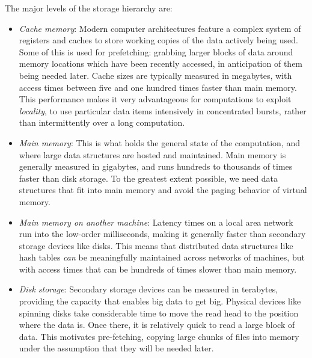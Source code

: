 \documentclass[10pt]{article}
\begin{document}
\begin{enumerate}
The major levels of the storage hierarchy are:
\begin{itemize}
    \item \textit{Cache memory}: Modern computer architectures feature a complex system of registers and caches to store working copies of the data actively being used. Some of this is used for prefetching: grabbing larger blocks of data around memory locations which have been recently accessed, in anticipation of them being needed later. Cache sizes are typically measured in megabytes, with access times between five and one hundred times faster than main memory. This performance makes it very advantageous for computations to exploit \textit{locality}, to use particular data items intensively in concentrated bursts, rather than intermittently over a long computation.
    \item \textit{Main memory}: This is what holds the general state of the computation, and where large data structures are hosted and maintained. Main memory is generally measured in gigabytes, and runs hundreds to thousands of times faster than disk storage. To the greatest extent possible, we need data structures that fit into main memory and avoid the paging behavior of virtual memory.
    \item \textit{Main memory on another machine}: Latency times on a local area network run into the low-order milliseconds, making it generally faster than secondary storage devices like disks. This means that distributed data structures like hash tables \textit{can} be meaningfully maintained across networks of machines, but with access times that can be hundreds of times slower than main memory.
    \item \textit{Disk storage}: Secondary storage devices can be measured in terabytes, providing the capacity that enables big data to get big. Physical devices like spinning disks take considerable time to move the read head to the position where the data is. Once there, it is relatively quick to read a large block of data. This motivates pre-fetching, copying large chunks of files into memory under the assumption that they will be needed later.
\end{itemize}


\end{enumerate}
\end{document}
